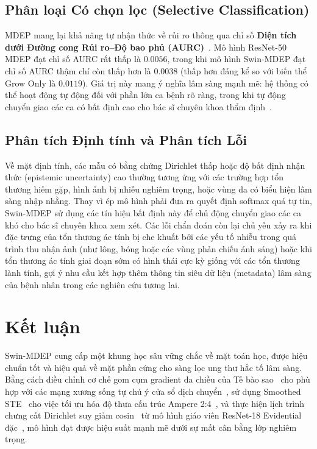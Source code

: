 \documentclass[11pt, a4paper]{article}
\begin{document}
\subsection{Phân loại Có chọn lọc (Selective Classification)}\label{subsec:selective}

MDEP mang lại khả năng tự nhận thức về rủi ro thông qua chỉ số \textbf{Diện tích dưới Đường cong Rủi ro--Độ bao phủ (AURC)}~\cite{geifman2017selective, geifman2019selectivenet, jaeger2023call}. Mô hình ResNet-50 MDEP đạt chỉ số AURC rất thấp là $0.0056$, trong khi mô hình Swin-MDEP đạt chỉ số AURC thậm chí còn thấp hơn là $0.0038$ (thấp hơn đáng kể so với biến thể Grow Only là $0.0119$). Giá trị này mang ý nghĩa lâm sàng mạnh mẽ: hệ thống có thể hoạt động tự động đối với phần lớn ca bệnh rõ ràng, trong khi tự động chuyển giao các ca có bất định cao cho bác sĩ chuyên khoa thẩm định~\cite{esteva2017dermatologist}.

\subsection{Phân tích Định tính và Phân tích Lỗi}\label{subsec:qualitative}

Về mặt định tính, các mẫu có bằng chứng Dirichlet thấp hoặc độ bất định nhận thức (epistemic uncertainty) cao thường tương ứng với các trường hợp tổn thương hiếm gặp, hình ảnh bị nhiễu nghiêm trọng, hoặc vùng da có biểu hiện lâm sàng nhập nhằng. Thay vì ép mô hình phải đưa ra quyết định softmax quá tự tin, Swin-MDEP sử dụng các tín hiệu bất định này để chủ động chuyển giao các ca khó cho bác sĩ chuyên khoa xem xét. Các lỗi chẩn đoán còn lại chủ yếu xảy ra khi đặc trưng của tổn thương ác tính bị che khuất bởi các yếu tố nhiễu trong quá trình thu nhận ảnh (như lông, bóng hoặc các vùng phản chiếu ánh sáng) hoặc khi tổn thương ác tính giai đoạn sớm có hình thái cực kỳ giống với các tổn thương lành tính, gợi ý nhu cầu kết hợp thêm thông tin siêu dữ liệu (metadata) lâm sàng của bệnh nhân trong các nghiên cứu tương lai.

\section{Kết luận}\label{sec:conclusion}

Swin-MDEP cung cấp một khung học sâu vững chắc về mặt toán học, được hiệu chuẩn tốt và hiệu quả về mặt phần cứng cho sàng lọc ung thư hắc tố lâm sàng. Bằng cách điều chỉnh cơ chế gom cụm gradient đa chiều của Tế bào sao~\cite{chung2013astrocytes} cho phù hợp với các mạng xương sống tự chú ý cửa sổ dịch chuyển~\cite{liu2021swin}, sử dụng Smoothed STE~\cite{bengio2013estimating} cho việc tối ưu hóa độ thưa cấu trúc Ampere 2:4~\cite{mishra2021accelerating}, và thực hiện lịch trình chưng cất Dirichlet suy giảm cosin~\cite{hinton2015distilling} từ mô hình giáo viên ResNet-18 Evidential đặc~\cite{he2016deep}, mô hình đạt được hiệu suất mạnh mẽ dưới sự mất cân bằng lớp nghiêm trọng.
\end{document}
